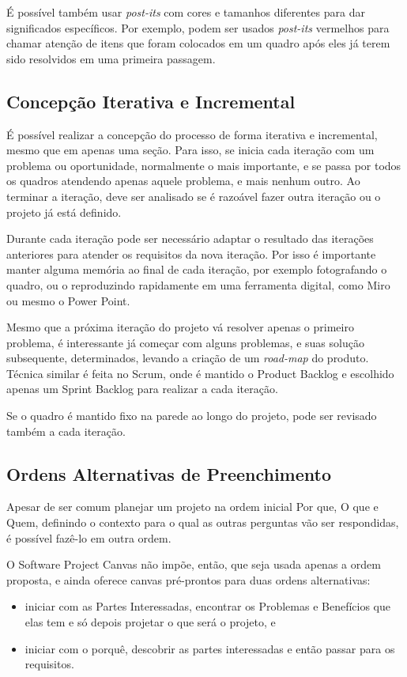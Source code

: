 \documentclass[a4]{report}
\begin{document}
É possível também usar \textit{post-its} com cores e tamanhos diferentes para dar significados específicos. Por exemplo, podem ser usados \textit{post-its} vermelhos para chamar atenção de itens que foram colocados em um quadro após eles já terem sido resolvidos em uma primeira passagem.

\subsection{Concepção Iterativa e Incremental}

É possível realizar a concepção do processo de forma iterativa e incremental, mesmo que em apenas uma seção. Para isso, se inicia cada iteração com um problema ou oportunidade, normalmente o mais importante, e se passa por todos os quadros atendendo apenas aquele problema, e mais nenhum outro. Ao terminar a iteração, deve ser analisado se é razoável fazer outra iteração ou o projeto já está definido.

Durante cada iteração pode ser necessário adaptar o resultado das iterações anteriores para atender os requisitos da nova iteração. Por isso é importante manter alguma memória ao final de cada iteração, por exemplo fotografando o quadro, ou o reproduzindo rapidamente em uma ferramenta digital, como Miro ou mesmo o Power Point.

Mesmo que a próxima iteração do projeto vá resolver apenas o primeiro problema, é interessante já começar com alguns problemas, e suas solução subsequente, determinados, levando a criação de um \textit{road-map} do produto. Técnica similar é feita no Scrum, onde é mantido o Product Backlog e escolhido apenas um Sprint Backlog para realizar a cada iteração\citep{scrum:sbok:guide}.

Se o quadro é mantido fixo na parede ao longo do projeto, pode ser revisado também a cada iteração.

\subsection{Ordens Alternativas de Preenchimento}

Apesar de ser comum planejar um projeto na ordem inicial Por que, O que e Quem, definindo o contexto para o qual as outras perguntas vão ser respondidas, é possível fazê-lo em outra ordem.

O Software Project Canvas não impõe, então, que seja usada apenas a ordem proposta, e ainda oferece canvas pré-prontos para duas ordens alternativas:
\begin{itemize}
    \item iniciar com as Partes Interessadas, encontrar os Problemas e Benefícios que elas tem e só depois projetar o que será o projeto, e
    \item iniciar com o porquê, descobrir as partes interessadas e então passar para os requisitos.
\end{itemize}
\end{document}
